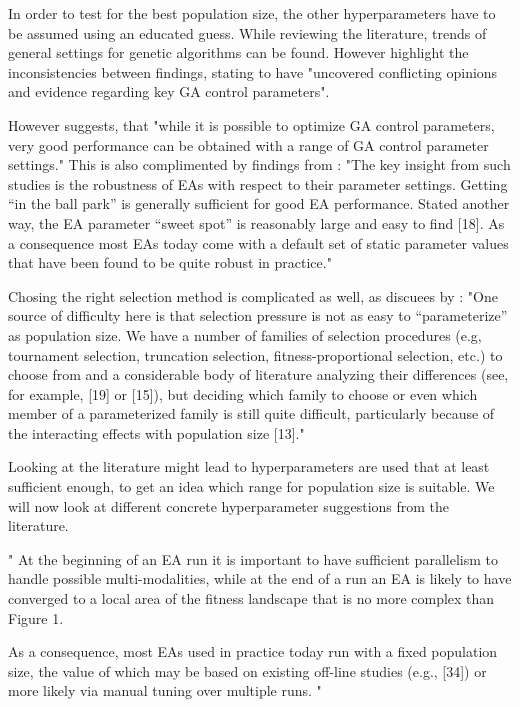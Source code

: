 In order to test for the best population size, the other hyperparameters have to be assumed using an educated guess. While reviewing the literature, trends of general settings for genetic algorithms can be found. However \cite{mills_determining_2015} highlight the inconsistencies between findings, stating to have "uncovered conflicting opinions and evidence regarding key GA control parameters". 

However \cite{grefenstette_optimization_1986} suggests, that "while it is possible to optimize GA control parameters, very good performance can be obtained with a range of GA control parameter settings." 
This is also complimented by findings from \cite{kacprzyk_parameter_2007}: "The key insight from such studies is the robustness of EAs with respect to their parameter settings. Getting “in the ball park” is generally sufficient for good EA performance. Stated another way, the EA parameter “sweet spot” is reasonably large and easy to find [18]. As a consequence most EAs today come with a default set of static parameter values that have been found to be quite robust in practice."

Chosing the right selection method is complicated as well, as discuees by \cite{kacprzyk_parameter_2007}:
"One source of difficulty here is that selection pressure is not as easy to “parameterize” as population size. We have a number of families of selection procedures (e.g, tournament selection, truncation selection, fitness-proportional selection, etc.) to choose from and a considerable body of literature analyzing their differences (see, for example, [19] or [15]), but deciding which family to choose or even which member of a parameterized family is still quite difficult, particularly because of the interacting effects with population size [13]."

Looking at the literature might lead to hyperparameters are used that at least sufficient enough, to get an idea which range for population size is suitable. We will now look at different concrete hyperparameter suggestions from the literature.

"
At the beginning of an EA run it is important to have sufficient parallelism to handle possible multi-modalities, while at the end of a run an EA is likely to have converged to a local area of the fitness landscape that is no more complex than Figure 1.

As a consequence, most EAs used in practice today run with a fixed population size, the value of which may be based on existing off-line studies (e.g., [34]) or more likely via manual tuning over multiple runs.
"\cite{kacprzyk_parameter_2007}

